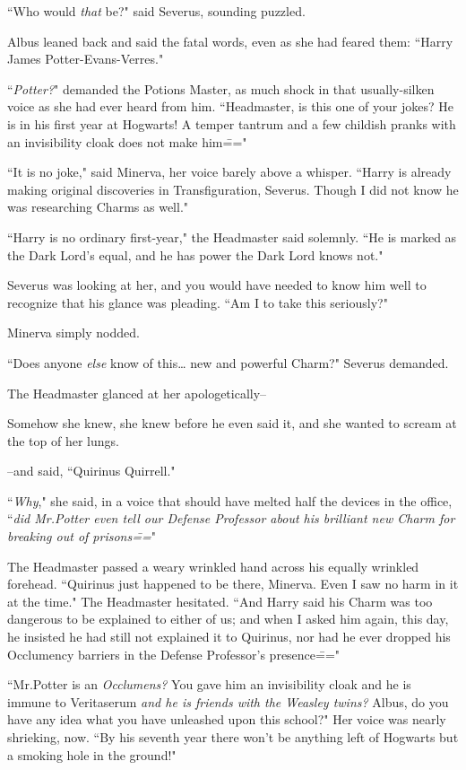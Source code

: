 ``Who would \emph{that} be?" said Severus, sounding puzzled.

Albus leaned back and said the fatal words, even as she had feared them: ``Harry James Potter-Evans-Verres."

``\emph{Potter?}" demanded the Potions Master, as much shock in that usually-silken voice as she had ever heard from him. ``Headmaster, is this one of your jokes? He is in his first year at Hogwarts! A temper tantrum and a few childish pranks with an invisibility cloak does not make him\==="

``It is no joke," said Minerva, her voice barely above a whisper. ``Harry is already making original discoveries in Transfiguration, Severus. Though I did not know he was researching Charms as well."

``Harry is no ordinary first-year," the Headmaster said solemnly. ``He is marked as the Dark Lord's equal, and he has power the Dark Lord knows not."

Severus was looking at her, and you would have needed to know him well to recognize that his glance was pleading. ``Am I to take this seriously?"

Minerva simply nodded.

``Does anyone \emph{else} know of this{\ldots} new and powerful Charm?" Severus demanded.

The Headmaster glanced at her apologetically\---

Somehow she knew, she knew before he even said it, and she wanted to scream at the top of her lungs.

\---and said, ``Quirinus Quirrell."

``\emph{Why}," she said, in a voice that should have melted half the devices in the office, ``\emph{did Mr.\?Potter even \emph{tell} our Defense Professor about his brilliant new Charm for breaking out of prisons\===}"

The Headmaster passed a weary wrinkled hand across his equally wrinkled forehead. ``Quirinus just happened to be there, Minerva. Even I saw no harm in it at the time." The Headmaster hesitated. ``And Harry said his Charm was too dangerous to be explained to either of us; and when I asked him again, this day, he insisted he had still not explained it to Quirinus, nor had he ever dropped his Occlumency barriers in the Defense Professor's presence\==="

``Mr.\?Potter is an \emph{Occlumens?} You gave him an invisibility cloak and he is immune to Veritaserum \emph{and he is friends with the Weasley twins?} Albus, do you have any idea what you have unleashed upon this school?" Her voice was nearly shrieking, now. ``By his seventh year there won't be anything left of Hogwarts but a smoking hole in the ground!"

